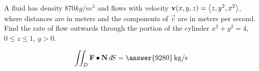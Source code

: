 \documentclass{ximera}
\author{David Guichard \and Neal Koblitz \and H. Jerome Keisler \and Albert Scheller \and Barry Balof \and Mike Wills \and Matthew Carr}
\begin{document}
\begin{exercise}




A fluid has density $870 \unit{kg/m^3}$ and flows with velocity $\mathbf{v}(x,y,z)=\left\langle z,y^2,x^2\right\rangle$, where distances are in meters and the components of $\vec{v}$ are in meters per second. Find the rate of flow outwards through the portion of the cylinder $x^2+y^2=4$, $0\le z\le 1$, $y>0$. 

\begin{prompt}
\[
\iint_{D}\vec{F}\dotp\vec{N}\d S=\answer{9280}\unit{kg/s}
\]
\end{prompt}


\end{exercise}
\end{document}
